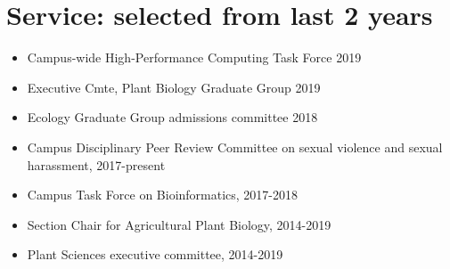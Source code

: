 \section*{Service: selected from last 2 years}
\begin{itemize}
\setlength\itemsep{0ex}
\subsection*{University}
\item Campus-wide High-Performance Computing Task Force 2019
\item Executive Cmte, Plant Biology Graduate Group 2019
\item Ecology Graduate Group admissions committee 2018
\item Campus Disciplinary Peer Review Committee on sexual violence and sexual harassment, 2017-present %
\item Campus Task Force on Bioinformatics, 2017-2018
\item Section Chair for Agricultural Plant Biology, 2014-2019
\item Plant Sciences executive committee, 2014-2019

\end{itemize}
